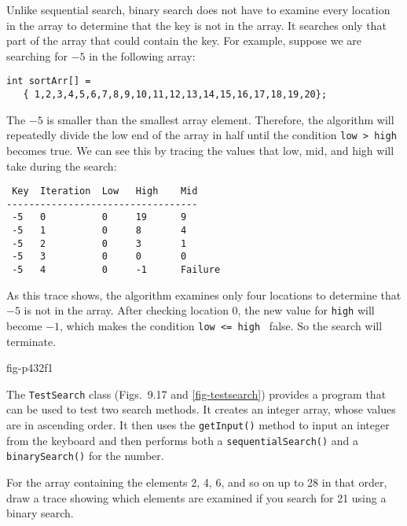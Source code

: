 Unlike sequential search, binary search does not have to examine every
location in the array to determine that the key is not in the array.
It searches only that part of the array that could contain the key.
For example, suppose we are searching for $-5$ in the following array:

\begin{jjjlisting}
\begin{lstlisting}
int sortArr[] = 
   { 1,2,3,4,5,6,7,8,9,10,11,12,13,14,15,16,17,18,19,20};
\end{lstlisting}
\end{jjjlisting}

\noindent The $-5$ is
smaller than the smallest array element. Therefore, the algorithm will
repeatedly divide the low end of the array in half until the condition
\verb|low > high| becomes true.  We can see this by tracing the values
that low, mid, and high will take during the search:

\begin{jjjlisting}
\begin{lstlisting}
 Key  Iteration  Low   High    Mid
----------------------------------
 -5   0          0     19      9
 -5   1          0     8       4
 -5   2          0     3       1
 -5   3          0     0       0
 -5   4          0     -1      Failure
\end{lstlisting}
\end{jjjlisting}

\noindent As this trace shows, the algorithm examines only
four locations to determine that $-5$ is not in the array.
After checking location 0, the new value for {\tt high} will become
$-1$, which makes the condition \verb|low <= high | false.  So the
search will terminate.

{fig-p432f1}


The {\tt TestSearch} class (Figs.~9.17 and \ref{fig-testsearch})
provides a  program that can be used to test two search methods.
It creates an integer array, whose values are in ascending order.  It
then uses the {\tt getInput()} method to input an integer from the
keyboard and then performs both a {\tt sequentialSearch()} and a {\tt
binarySearch()} for the number.


\begin{SSTUDY}

\item  For the array containing the elements 2, 4, 6, and so on up to 28 in
that order, draw a trace showing which elements are examined if you
search for 21 using a binary search.

\end{SSTUDY}

